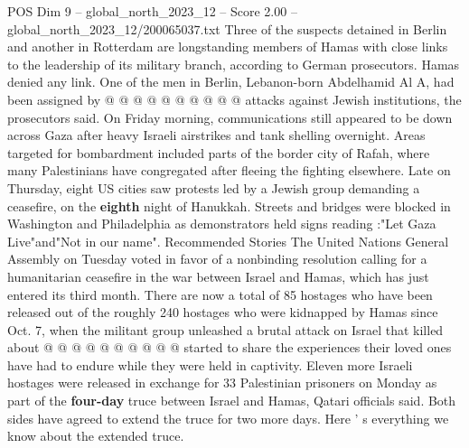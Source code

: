 \begin{textsample}{POS Dim 9 – global\_north\_2023\_12 – Score 2.00 – global\_north\_2023\_12/200065037.txt}
Three of the suspects detained in Berlin and another in Rotterdam are longstanding members of Hamas with close links to the leadership of its military branch, according to German prosecutors.
Hamas denied any link.
One of the men in Berlin, Lebanon-born Abdelhamid Al A, had been assigned by @ @ @ @ @ @ @ @ @ @ attacks against Jewish institutions, the prosecutors said.
On Friday morning, communications still appeared to be down across Gaza after heavy Israeli airstrikes and tank shelling overnight.
Areas targeted for bombardment included parts of the border city of Rafah, where many Palestinians have congregated after fleeing the fighting elsewhere.
Late on Thursday, eight US cities saw protests led by a Jewish group demanding a ceasefire, on the \textbf{eighth} night of Hanukkah.
Streets and bridges were blocked in Washington and Philadelphia as demonstrators held signs reading :"Let Gaza Live"and"Not in our name".
Recommended Stories The United Nations General Assembly on Tuesday voted in favor of a nonbinding resolution calling for a humanitarian ceasefire in the war between Israel and Hamas, which has just entered its third month.
There are now a total of 85 hostages who have been released out of the roughly 240 hostages who were kidnapped by Hamas since Oct. 7, when the militant group unleashed a brutal attack on Israel that killed about @ @ @ @ @ @ @ @ @ @ started to share the experiences their loved ones have had to endure while they were held in captivity.
Eleven more Israeli hostages were released in exchange for 33 Palestinian prisoners on Monday as part of the \textbf{four-day} truce between Israel and Hamas, Qatari officials said.
Both sides have agreed to extend the truce for two more days.
Here ' s everything we know about the extended truce.

\end{textsample}
